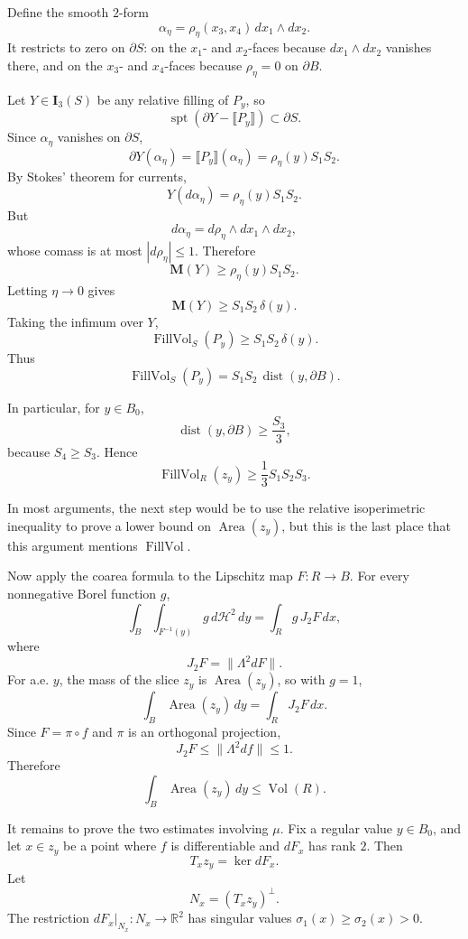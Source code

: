 \documentclass[12pt]{article}
\newcommand{\review}[1]{\begin{reviewbox}#1\end{reviewbox}}
\begin{document}
Define the smooth \(2\)-form
\[
\alpha_\eta=\rho_\eta(x_3,x_4)\,dx_1\wedge dx_2.
\]
It restricts to zero on \(\partial S\): on the \(x_1\)- and \(x_2\)-faces because \(dx_1\wedge dx_2\) vanishes there, and on the \(x_3\)- and \(x_4\)-faces because \(\rho_\eta=0\) on \(\partial B\).

Let \(Y\in\mathbf I_3(S)\) be any relative filling of \(P_y\), so
\[
\operatorname{spt}(\partial Y-\llbracket P_y\rrbracket)\subset \partial S.
\]
Since \(\alpha_\eta\) vanishes on \(\partial S\),
\[
\partial Y(\alpha_\eta)
=
\llbracket P_y\rrbracket(\alpha_\eta)
=
\rho_\eta(y)S_1S_2.
\]
By Stokes’ theorem for currents,
\[
Y(d\alpha_\eta)=\rho_\eta(y)S_1S_2.
\]
But
\[
d\alpha_\eta=d\rho_\eta\wedge dx_1\wedge dx_2,
\]
whose comass is at most \(|d\rho_\eta|\le 1\). Therefore
\[
\mathbf M(Y)\ge \rho_\eta(y)S_1S_2.
\]
Letting \(\eta\to 0\) gives
\[
\mathbf M(Y)\ge S_1S_2\,\delta(y).
\]
Taking the infimum over \(Y\),
\[
\operatorname{FillVol}_S(P_y)\ge S_1S_2\,\delta(y).
\]
Thus
\[
\operatorname{FillVol}_S(P_y)=S_1S_2\,\operatorname{dist}(y,\partial B).
\]

In particular, for \(y\in B_0\),
\[
\operatorname{dist}(y,\partial B)\ge \frac{S_3}{3},
\]
because \(S_4\ge S_3\). Hence
\[
\operatorname{FillVol}_R(z_y)\ge \frac13 S_1S_2S_3.
\]

\review{In most arguments, the next step would be to use the relative isoperimetric inequality to prove a lower bound on $\operatorname{Area}(z_y)$, but this is the last place that this argument mentions $\operatorname{FillVol}$.}

Now apply the coarea formula to the Lipschitz map \(F:R\to B\). For every nonnegative Borel function \(g\),
\[
\int_B\int_{F^{-1}(y)} g\,d\mathcal H^2\,dy
=
\int_R g\,J_2F\,dx,
\]
where
\[
J_2F=\|\Lambda^2 dF\|.
\]
For a.e. \(y\), the mass of the slice \(z_y\) is \(\operatorname{Area}(z_y)\), so with \(g=1\),
\[
\int_B \operatorname{Area}(z_y)\,dy
=
\int_R J_2F\,dx.
\]
Since \(F=\pi\circ f\) and \(\pi\) is an orthogonal projection,
\[
J_2F\le \|\Lambda^2df\|\le 1.
\]
Therefore
\[
\int_B \operatorname{Area}(z_y)\,dy
\le
\operatorname{Vol}(R).
\]

It remains to prove the two estimates involving \(\mu\). Fix a regular value \(y\in B_0\), and let \(x\in z_y\) be a point where \(f\) is differentiable and \(dF_x\) has rank \(2\). Then
\[
T_xz_y=\ker dF_x.
\]
Let
\[
N_x=(T_xz_y)^\perp.
\]
The restriction \(dF_x|_{N_x}:N_x\to\mathbb R^2\) has singular values \(\sigma_1(x)\ge \sigma_2(x)>0\).
\end{document}
